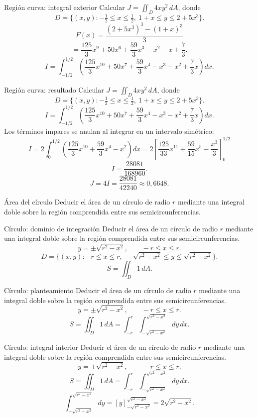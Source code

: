 \documentclass[main.tex]{subfiles}
\begin{document}
\begin{frame}{Región curva: integral exterior}
\small Calcular $J=\iint_D4xy^2\,dA$, donde\[D=\{(x,y):-\tfrac12\le x\le\tfrac12,\ 1+x\le y\le2+5x^3\}.\]\[F(x)=\frac{(2+5x^3)^3-(1+x)^3}{3}\]\[=\frac{125}{3}x^9+50x^6+\frac{59}{3}x^3-x^2-x+\frac73.\]\[I=\int_{-1/2}^{1/2}\left(\frac{125}{3}x^{10}+50x^7+\frac{59}{3}x^4-x^3-x^2+\frac73x\right)dx.\]
\end{frame}

\begin{frame}{Región curva: resultado}
\small Calcular $J=\iint_D4xy^2\,dA$, donde\[D=\{(x,y):-\tfrac12\le x\le\tfrac12,\ 1+x\le y\le2+5x^3\}.\]\[I=\int_{-1/2}^{1/2}\left(\frac{125}{3}x^{10}+50x^7+\frac{59}{3}x^4-x^3-x^2+\frac73x\right)dx.\]Los términos impares se anulan al integrar en un intervalo simétrico:\[I=2\int_0^{1/2}\left(\frac{125}{3}x^{10}+\frac{59}{3}x^4-x^2\right)dx=2\left[\frac{125}{33}x^{11}+\frac{59}{15}x^5-\frac{x^3}{3}\right]_0^{1/2}\]
\[I=\frac{28081}{168960}.\]\[\boxed{J=4I=\frac{28081}{42240}\approx0{,}6648.}\]
\end{frame}

\begin{frame}{Área del círculo}
Deducir el área de un círculo de radio $r$ mediante una integral doble sobre la región comprendida entre sus semicircunferencias.
\end{frame}

\begin{frame}{Círculo: dominio de integración}
Deducir el área de un círculo de radio $r$ mediante una integral doble sobre la región comprendida entre sus semicircunferencias.\[y=\pm\sqrt{r^2-x^2},\qquad -r\le x\le r.\]\[D=\{(x,y):-r\le x\le r,\ -\sqrt{r^2-x^2}\le y\le\sqrt{r^2-x^2}\}.\]\[S=\iint_D1\,dA.\]
\end{frame}

\begin{frame}{Círculo: planteamiento}
Deducir el área de un círculo de radio $r$ mediante una integral doble sobre la región comprendida entre sus semicircunferencias.\[y=\pm\sqrt{r^2-x^2},\qquad -r\le x\le r.\]\[S=\iint_D1\,dA=\int_{-r}^r\int_{-\sqrt{r^2-x^2}}^{\sqrt{r^2-x^2}}dy\,dx.\]
\end{frame}

\begin{frame}{Círculo: integral interior}
\small Deducir el área de un círculo de radio $r$ mediante una integral doble sobre la región comprendida entre sus semicircunferencias.\[y=\pm\sqrt{r^2-x^2},\qquad -r\le x\le r.\]\[S=\iint_D1\,dA=\int_{-r}^r\int_{-\sqrt{r^2-x^2}}^{\sqrt{r^2-x^2}}dy\,dx.\]\[\int_{-\sqrt{r^2-x^2}}^{\sqrt{r^2-x^2}}dy=[y]_{-\sqrt{r^2-x^2}}^{\sqrt{r^2-x^2}}=2\sqrt{r^2-x^2}.\]
\end{frame}
\end{document}

